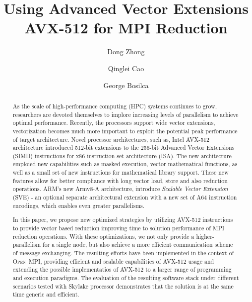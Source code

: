 \documentclass[sigconf]{acmart}
\newcommand{\ompi}[0]{\textsc{Open~MPI}\xspace}
\newcommand{\sve}[0]{\textsc{SVE}\xspace}
\begin{document}
\title{Using Advanced Vector Extensions AVX-512 for MPI Reduction}

\author{Dong Zhong}

\author{Qinglei Cao}

\author{George Bosilca}
%

\begin{abstract}
  As the scale of high-performance computing (HPC) systems continues to grow,
  researchers are devoted themselves to implore increasing levels of parallelism
  to achieve optimal performance.
  Recently, the processors support wide vector extensions,
  vectorization becomes much more important to exploit the potential peak performance of
  target architecture.
  Novel processor architectures, such as, Intel AVX-512 architecture introduced 512-bit extensions
  to the 256-bit Advanced Vector Extensions (SIMD) instructions for x86 instruction set architecture (ISA).
  The new architecture emploied new capabilities such as masked execution, vector mathematical functions, as well as a small set of new instructions for mathematical library support. These new features allow for better compliance with long vector load, store and also reduction operations.
  ARM's new Armv8-A
  architecture, introduce \emph{Scalable Vector Extension} (\sve)
  - an optional separate architectural extension with a new set of A64
  instruction encodings, which enables even greater parallelisms.

  In this paper, we propose new optimized strategies by utilizing AVX-512 instructions to provide
  vector based reduction improving time to solution performance of MPI reduction operations.
%
  With these optimizations, we not only provide a higher-parallelism for a single node,
  but also achieve a more efficient communication scheme of message exchanging.
  The resulting efforts have been implemented in the context of \ompi, providing
  efficient and scalable capabilities of AVX-512 usage and extending the possible
  implementatios of AVX-512 to a larger range of programming and execution paradigms.
%
  The evaluation of the resulting software stack under different scenarios tested with
  Skylake processor demonstrates that the solution is at the same time generic and efficient.

\end{abstract}
\end{document}
